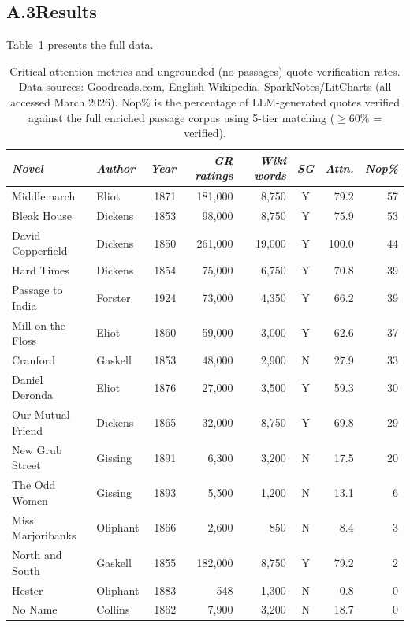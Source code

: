 \subsection*{A.3\quad Results}

Table~\ref{tab:attention} presents the full data.

\begin{table}[ht]
\centering
\small
\caption{Critical attention metrics and ungrounded (no-passages) quote
verification rates.  Data sources: Goodreads.com, English Wikipedia,
SparkNotes/LitCharts (all accessed March 2026).  Nop\% is the
percentage of LLM-generated quotes verified against the full enriched
passage corpus using 5-tier matching ($\geq$60\% = verified).}
\label{tab:attention}
\begin{tabularx}{\textwidth}{X|l|r|r|r|c|r|r}
\toprule
\textit{Novel} & \textit{Author} & \textit{Year} &
  \textit{GR ratings} & \textit{Wiki words} & \textit{SG} &
  \textit{Attn.} & \textit{Nop\%} \\
\midrule
Middlemarch        & Eliot    & 1871 & 181,000 & 8,750  & Y &  79.2 & 57 \\
Bleak House        & Dickens  & 1853 &  98,000 & 8,750  & Y &  75.9 & 53 \\
David Copperfield  & Dickens  & 1850 & 261,000 & 19,000 & Y & 100.0 & 44 \\
Hard Times         & Dickens  & 1854 &  75,000 & 6,750  & Y &  70.8 & 39 \\
Passage to India   & Forster  & 1924 &  73,000 & 4,350  & Y &  66.2 & 39 \\
Mill on the Floss  & Eliot    & 1860 &  59,000 & 3,000  & Y &  62.6 & 37 \\
Cranford           & Gaskell  & 1853 &  48,000 & 2,900  & N &  27.9 & 33 \\
Daniel Deronda     & Eliot    & 1876 &  27,000 & 3,500  & Y &  59.3 & 30 \\
Our Mutual Friend  & Dickens  & 1865 &  32,000 & 8,750  & Y &  69.8 & 29 \\
New Grub Street    & Gissing  & 1891 &   6,300 & 3,200  & N &  17.5 & 20 \\
The Odd Women      & Gissing  & 1893 &   5,500 & 1,200  & N &  13.1 &  6 \\
Miss Marjoribanks  & Oliphant & 1866 &   2,600 &   850  & N &   8.4 &  3 \\
North and South    & Gaskell  & 1855 & 182,000 & 8,750  & Y &  79.2 &  2 \\
Hester             & Oliphant & 1883 &     548 & 1,300  & N &   0.8 &  0 \\
No Name            & Collins  & 1862 &   7,900 & 3,200  & N &  18.7 &  0 \\
\bottomrule
\end{tabularx}
\end{table}

